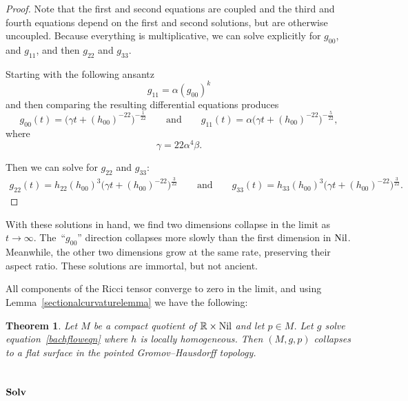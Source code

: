 \documentclass[pdftex]{sigma}
\numberwithin{equation}{section}
\newtheorem{Theorem}{Theorem}[section]
\begin{document}
\begin{proof}
Note that the first and second equations are coupled and the third and fourth equations depend on the first and second solutions, but are otherwise uncoupled. Because everything is multiplicative, we can solve explicitly for $g_{00}$, and $g_{11}$, and then $g_{22}$ and $g_{33}$.

Starting with the following ansantz
\begin{equation*} %
g_{11} = \alpha (g_{00})^k
\end{equation*}
and then comparing the resulting differential equations produces
\[
g_{00}(t) = \big(\gamma t + (h_{00})^{-22}\big)^{-\frac{1}{22}}
\qquad \text{and}\qquad g_{11}(t) = \alpha \big(\gamma t + (h_{00})^{-22} \big)^{-\frac{5}{22}},
\]
where
\[
\gamma = 22 \alpha^4 \beta.
\]

Then we can solve for $g_{22}$ and $g_{33}$:
\begin{gather*}
g_{22}(t) = h_{22} (h_{00})^{3}
		\big(\gamma t + (h_{00})^{-22} \big)^{\frac{3}{22}}
\qquad \text{and}\qquad
g_{33}(t) = h_{33} (h_{00})^{3}
		\big(\gamma t + (h_{00})^{-22}\big)^{\frac{3}{22}}.\tag*{\qed}
\end{gather*}\renewcommand{\qed}{}
\end{proof}

With these solutions in hand, we find two dimensions collapse in the limit as $t \rightarrow \infty$. The~``$g_{00}$'' direction collapses more slowly than the first dimension in ${\rm Nil}$. Meanwhile, the other two dimensions grow at the same rate, preserving their aspect ratio. These solutions are immortal, but not ancient.

All components of the Ricci tensor converge to zero in the limit, and using Lemma~\ref{sectionalcurvaturelemma} we have the following:

\begin{Theorem}Let $M$ be a compact quotient of $\mathbb{R} \times {\rm Nil}$ and let $p \in M$. Let $g$ solve equation~\eqref{bachfloweqn} where $h$ is locally homogeneous. Then $(M, g, p)$ collapses to a flat surface in the pointed Gromov--Hausdorff topology.
\end{Theorem}

\subsection[${\rm Solv}$]{$\boldsymbol{{\rm Solv}}$} \label{solvsection}
\end{document}
